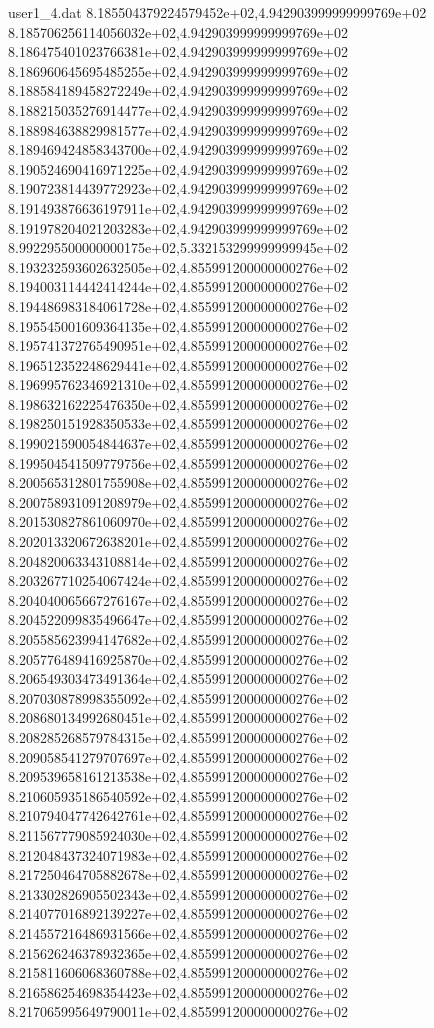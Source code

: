 \begin{filecontents}{user1_4.dat}
8.185504379224579452e+02,4.942903999999999769e+02
8.185706256114056032e+02,4.942903999999999769e+02
8.186475401023766381e+02,4.942903999999999769e+02
8.186960645695485255e+02,4.942903999999999769e+02
8.188584189458272249e+02,4.942903999999999769e+02
8.188215035276914477e+02,4.942903999999999769e+02
8.188984638829981577e+02,4.942903999999999769e+02
8.189469424858343700e+02,4.942903999999999769e+02
8.190524690416971225e+02,4.942903999999999769e+02
8.190723814439772923e+02,4.942903999999999769e+02
8.191493876636197911e+02,4.942903999999999769e+02
8.191978204021203283e+02,4.942903999999999769e+02
8.992295500000000175e+02,5.332153299999999945e+02
8.193232593602632505e+02,4.855991200000000276e+02
8.194003114442414244e+02,4.855991200000000276e+02
8.194486983184061728e+02,4.855991200000000276e+02
8.195545001609364135e+02,4.855991200000000276e+02
8.195741372765490951e+02,4.855991200000000276e+02
8.196512352248629441e+02,4.855991200000000276e+02
8.196995762346921310e+02,4.855991200000000276e+02
8.198632162225476350e+02,4.855991200000000276e+02
8.198250151928350533e+02,4.855991200000000276e+02
8.199021590054844637e+02,4.855991200000000276e+02
8.199504541509779756e+02,4.855991200000000276e+02
8.200565312801755908e+02,4.855991200000000276e+02
8.200758931091208979e+02,4.855991200000000276e+02
8.201530827861060970e+02,4.855991200000000276e+02
8.202013320672638201e+02,4.855991200000000276e+02
8.204820063343108814e+02,4.855991200000000276e+02
8.203267710254067424e+02,4.855991200000000276e+02
8.204040065667276167e+02,4.855991200000000276e+02
8.204522099835496647e+02,4.855991200000000276e+02
8.205585623994147682e+02,4.855991200000000276e+02
8.205776489416925870e+02,4.855991200000000276e+02
8.206549303473491364e+02,4.855991200000000276e+02
8.207030878998355092e+02,4.855991200000000276e+02
8.208680134992680451e+02,4.855991200000000276e+02
8.208285268579784315e+02,4.855991200000000276e+02
8.209058541279707697e+02,4.855991200000000276e+02
8.209539658161213538e+02,4.855991200000000276e+02
8.210605935186540592e+02,4.855991200000000276e+02
8.210794047742642761e+02,4.855991200000000276e+02
8.211567779085924030e+02,4.855991200000000276e+02
8.212048437324071983e+02,4.855991200000000276e+02
8.217250464705882678e+02,4.855991200000000276e+02
8.213302826905502343e+02,4.855991200000000276e+02
8.214077016892139227e+02,4.855991200000000276e+02
8.214557216486931566e+02,4.855991200000000276e+02
8.215626246378932365e+02,4.855991200000000276e+02
8.215811606068360788e+02,4.855991200000000276e+02
8.216586254698354423e+02,4.855991200000000276e+02
8.217065995649790011e+02,4.855991200000000276e+02

\end{filecontents}
